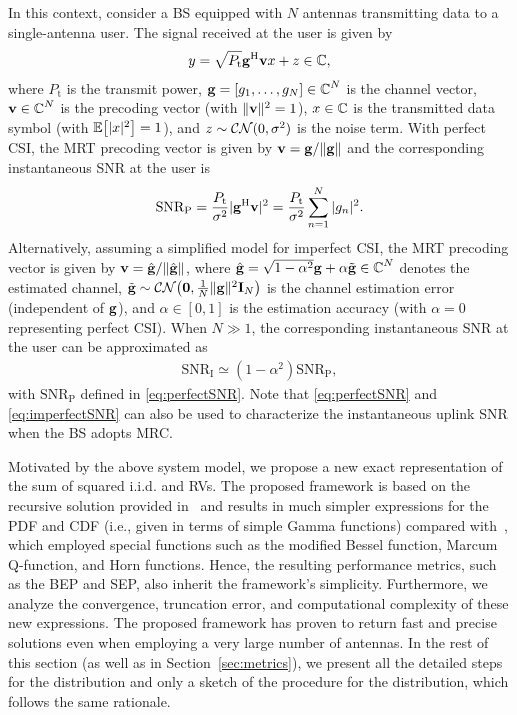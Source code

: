 \documentclass[journal,twocolumn]{IEEEtran}
\begin{document}
In this context, consider a \ac{BS} equipped with $N$ antennas transmitting data to a single-antenna user. The signal received at the user is given by
\begin{align}
y = \sqrt{P_{\textrm{t}}} \mathbf{g}^{\mathrm{H}} \mathbf{v} x + z \in \mbox{$\mathbb{C}$},
\end{align}
where $P_{\textrm{t}}$ is the transmit power, $\mathbf{g} = [g_{1}, \ldots, g_{N}] \in \mbox{$\mathbb{C}$}^{N}$ is the channel vector, $\mathbf{v} \in \mbox{$\mathbb{C}$}^{N}$ is the precoding vector (with $\| \mathbf{v} \|^{2} = 1$), $x \in \mbox{$\mathbb{C}$}$ is the transmitted data symbol (with $\mathbb{E}\big[ |x|^{2} \big] = 1$), and $z \sim \mathcal{C} \mathcal{N}(0, \sigma^{2})$ is the noise term. With perfect \ac{CSI}, the \ac{MRT} precoding vector is given by $\mathbf{v} = \mathbf{g}/\| \mathbf{g} \|$ and the corresponding instantaneous \ac{SNR} at the user is
\begin{align} \label{eq:perfectSNR}
\textrm{SNR}_{\textrm{P}} = \frac{P_{\textrm{t}}}{\sigma^{2}} |\mathbf{g}^{\mathrm{H}} \mathbf{v}|^{2} = \frac{P_{\textrm{t}}}{\sigma^{2}} \sum_{n=1}^{N} |g_{n}|^{2}.
\end{align}
Alternatively, assuming a simplified model for imperfect \ac{CSI}, the \ac{MRT} precoding vector is given by $\mathbf{v} = \hat{\mathbf{g}}/\|\hat{\mathbf{g}}\|$, where $\hat{\mathbf{g}} = \sqrt{1-\alpha^{2}} \mathbf{g} + \alpha\tilde{\mathbf{g}} \in \mbox{$\mathbb{C}$}^N$ denotes the estimated channel, $\tilde{\mathbf{g}} \sim \mathcal{C} \mathcal{N} \big(\mathbf{0}, \frac{1}{N} \| \mathbf{g} \|^{2} \mathbf{I}_{N}\big)$ is the channel estimation error (independent of $\mathbf{g}$), and $\alpha \in [0,1]$ is the estimation accuracy (with $\alpha=0$ representing perfect \ac{CSI}). When $N \gg 1$, the corresponding instantaneous \ac{SNR} at the user can be approximated as
\begin{align} \label{eq:imperfectSNR}
\textrm{SNR}_{\textrm{I}} \simeq (1-\alpha^{2}) \textrm{SNR}_{\textrm{P}},
\end{align}
with $\textrm{SNR}_{\textrm{P}}$ defined in \eqref{eq:perfectSNR}. Note that \eqref{eq:perfectSNR} and \eqref{eq:imperfectSNR} can also be used to characterize the instantaneous uplink \ac{SNR} when the \ac{BS} adopts \ac{MRC}.

Motivated by the above system model, we propose a new exact representation of the sum of squared \ac{i.i.d.} \Ehm{} and \km{} \acp{RV}. The proposed framework is based on the recursive solution provided in~\cite{Alm23a} and results in much simpler expressions for the \ac{PDF} and \ac{CDF} (i.e., given in terms of simple Gamma functions) compared with~\cite{Mil08,Bad21,Dix23}, which employed special functions such as the modified Bessel function, Marcum Q-function, and Horn functions. Hence, the resulting performance metrics, such as the \ac{BEP} and \ac{SEP}, also inherit the framework's simplicity. Furthermore, we analyze the convergence, truncation error, and computational complexity of these new expressions. The proposed framework has proven to return fast and precise solutions even when employing a very large number of antennas. In the rest of this section (as well as in Section~\ref{sec:metrics}), we present all the detailed steps for the \Ehm{} distribution and only a sketch of the procedure for the \km{} distribution, which follows the same rationale.
\end{document}
